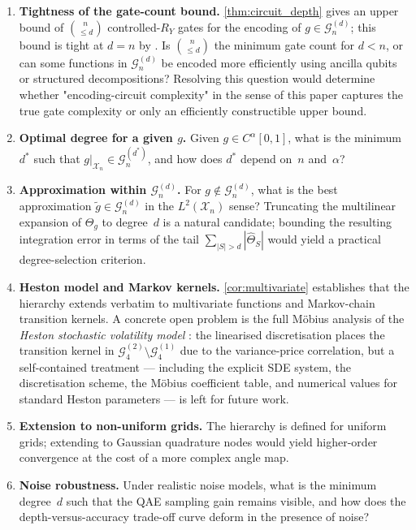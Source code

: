 \documentclass[12pt,a4paper]{article}
\theoremstyle{plain}
\theoremstyle{definition}
\theoremstyle{remark}
\newcommand{\Ry}{R_Y}
\newcommand{\Gclass}[2]{\mathcal{G}_{#1}^{(#2)}}
\newcommand{\Thetag}{\Theta_g}
\newcommand{\wh}[2]{\hat{#1}_{#2}}
\begin{document}
\begin{enumerate}[label=(\roman*)]
\item
  \textbf{Tightness of the gate-count bound.}
  \cref{thm:circuit_depth} gives an upper bound of $\binom{n}{\leq d}$
  controlled-$\Ry$ gates for the encoding of $g\in\Gclass{n}{d}$;
  this bound is tight at $d=n$ by \cite{ShendeBullockMarkov2006}.
  Is $\binom{n}{\leq d}$ the minimum gate count for $d < n$, or can
  some functions in $\Gclass{n}{d}$ be encoded more efficiently using
  ancilla qubits or structured decompositions?
  Resolving this question would determine whether "encoding-circuit
  complexity" in the sense of this paper captures the true gate
  complexity or only an efficiently constructible upper bound.

\item
  \textbf{Optimal degree for a given $g$.}
  Given $g\in C^\alpha[0,1]$, what is the minimum $d^*$ such that
  $g|_{\mathcal{X}_n}\in\Gclass{n}{d^*}$, and how
  does $d^*$ depend on~$n$ and~$\alpha$?

\item
  \textbf{Approximation within $\Gclass{n}{d}$.}
  For $g\notin\Gclass{n}{d}$, what is the best approximation
  $\tilde{g}\in\Gclass{n}{d}$ in the $L^2(\mathcal{X}_n)$ sense?
  Truncating the multilinear expansion of $\Thetag$ to degree~$d$ is a
  natural candidate; bounding the resulting integration error in terms
  of the tail $\sum_{|S|>d}|\wh{\Theta}{S}|$ would yield a practical
  degree-selection criterion.

\item
  \textbf{Heston model and Markov kernels.}
  \cref{cor:multivariate} establishes that the hierarchy extends verbatim
  to multivariate functions and Markov-chain transition kernels.
  A concrete open problem is the full Möbius analysis of the
  \emph{Heston stochastic volatility model}
  \cite{CarreraVazquezWoerner2020}: the linearised discretisation places
  the transition kernel in $\Gclass{4}{2}\setminus\Gclass{4}{1}$ due to
  the variance-price correlation, but a self-contained treatment
  — including the explicit SDE system, the discretisation scheme, the
  Möbius coefficient table, and numerical values for standard Heston
  parameters — is left for future work.

\item
  \textbf{Extension to non-uniform grids.}
  The hierarchy is defined for uniform grids; extending to Gaussian
  quadrature nodes would yield higher-order convergence at the cost
  of a more complex angle map.

\item
  \textbf{Noise robustness.}
  Under realistic noise models, what is the minimum degree~$d$ such
  that the QAE sampling gain remains visible, and how does the
  depth-versus-accuracy trade-off curve deform in the presence of noise?
\end{enumerate}
\end{document}
